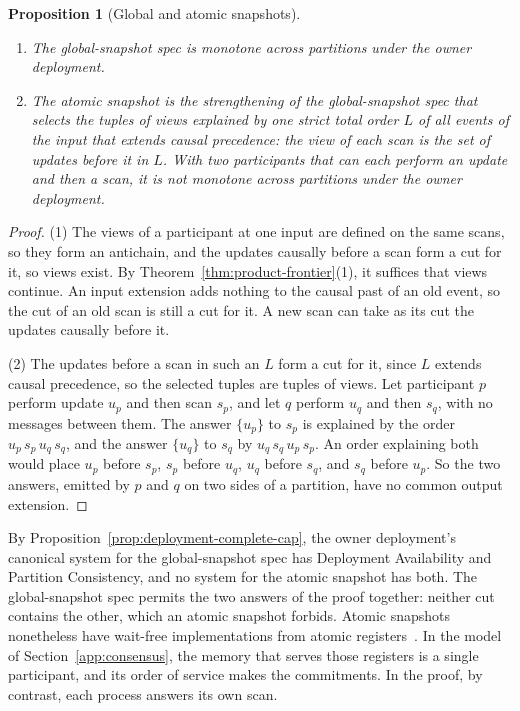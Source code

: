 \documentclass[sigconf]{cidr-2027}
\newtheorem{proposition}{Proposition}
\theoremstyle{remark}
\newcommand{\commitments}{commitments\xspace}
\newcommand{\indesc}{input extension\xspace} %
\newcommand{\outnoun}{output extension\xspace}%
\begin{document}
\begin{proposition}[Global and atomic snapshots]
\label{prop:snapshots}
\leavevmode
\begin{enumerate}
\item
The global-snapshot spec is monotone across partitions under the owner
        deployment.
\item
The atomic snapshot is the strengthening of the global-snapshot spec
        that selects the tuples of views explained by one strict total order
        $L$ of all events of the input that extends causal precedence: the
        view of each scan is the set of updates before it in $L$. With two
        participants that can each perform an update and then a scan, it is
        not monotone across partitions under the owner deployment.
\end{enumerate}
\end{proposition}

\begin{proof}
(1) The views of a participant at one input are defined on the same scans,
so they form an antichain, and the updates causally before a scan form a cut
for it, so views exist. By Theorem~\ref{thm:product-frontier}(1), it
suffices that views continue. An \indesc adds nothing to the causal past of
an old event, so the cut of an old scan is still a cut for it. A new scan can take as its cut the
updates causally before it.

(2) The updates before a scan in such an $L$ form a cut for it, since $L$
extends causal precedence, so the selected tuples are tuples of views. Let
participant $p$ perform update $u_p$ and then scan $s_p$, and let $q$
perform $u_q$ and then $s_q$, with no messages between them. The answer
$\{u_p\}$ to $s_p$ is explained by the order $u_p\,s_p\,u_q\,s_q$, and the
answer $\{u_q\}$ to $s_q$ by $u_q\,s_q\,u_p\,s_p$. An order explaining both
would place $u_p$ before $s_p$, $s_p$ before $u_q$, $u_q$ before $s_q$, and
$s_q$ before $u_p$. So the two answers, emitted by $p$ and $q$ on two sides of
a partition, have no common \outnoun.
\end{proof}

By Proposition~\ref{prop:deployment-complete-cap}, the owner deployment's
canonical system for the global-snapshot spec has Deployment Availability and
Partition Consistency, and no system for the atomic snapshot has both. The
global-snapshot spec permits the two answers of the proof together: neither
cut contains the other, which an atomic snapshot forbids. Atomic snapshots
nonetheless have wait-free implementations from atomic
registers~\cite{afek1993atomic}. In the model of
Section~\ref{app:consensus}, the memory that serves those registers is a
single participant, and its order of service makes the \commitments. In the
proof, by contrast, each process answers its own scan.
\end{document}

